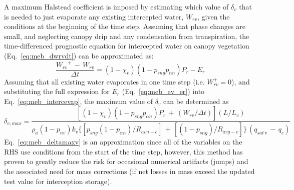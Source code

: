 {A maximum Halstead coefficient
is imposed by estimating which value of
$\delta_v$ that is needed to just evaporate
any existing intercepted water, $W_{rv}$, given the conditions at
the beginning of the time step.
%
Assuming that phase changes are small, and neglecting
canopy drip and any condensation from transpiration,
the time-differenced prognostic equation for intercepted water on 
canopy vegetation 
(Eq.~\ref{eq:meb_dwrvdt}) can be approximated as:
%
\begin{equation}
\label{eq:meb_intercevap}
\frac{{W_{rv}}^+ \,-\, {W_{rv}}}{\Delta t} =
(1-\chi_{v})(1-p_{sng}p_{\alpha n}) P_r - E_r
\end{equation}
%
Assuming that all existing water evaporates in one time step (i.e. $W_{rv}^+=0$),
and substituting the full expression for $E_r$ (Eq.~\ref{eq:meb_ev_er}) into
Eq.~\ref{eq:meb_intercevap}, 
the maximum value of $\delta_v$ can be determined as
%
\begin{equation}
\label{eq:meb_deltamaxv}
%
\delta_{v,max} = 
\frac{ 
\left[
\left(1-\chi_{v}\right) \left(1-p_{sng}p_{\alpha n}\right) P_r 
\,+\, \left( {W_{rv}} / \Delta t \right)
\right] \left(L/L_v\right)
}
{\rho_a \left(1-p_{nv}\right) k_v 
\Big\lbrace
\left[ 
p_{sng}\left(1-p_{\alpha n}\right)/R_{avn-c}
\right]
\,+\,
\left[ 
\left(1-p_{sng}\right)/R_{avg-c} 
\right] 
\Big\rbrace
\,
\left( {q_{sat\,v}} \,-\, {q_c} \right) 
}
\end{equation}
%
Eq.~\ref{eq:meb_deltamaxv} is an approximation 
since all of the variables on the RHS 
use conditions from the start of the time step, however,
this method has proven to greatly reduce the risk for occasional numerical
artifacts (jumps) and the associated need for mass corrections
(if net losses in mass exceed the updated test value for interception
storage).



}
